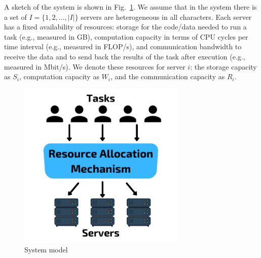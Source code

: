 A sketch of the system is shown in Fig.~\ref{fig:system_model}.
We assume that in the system there is a set of $I = \{1,2,\ldots,\left|I\right|\}$ servers are heterogeneous in all
characters. Each server has a fixed availability of resources: storage for the code/data needed to run a task
(e.g., measured in GB), computation capacity in terms of CPU cycles per time interval (e.g., measured in FLOP/s),
and communication bandwidth to receive the data and to send back the results of the task after execution
(e.g., measured in Mbit/s). We denote these resources for server $i$: the storage capacity as $S_i$, computation
capacity as $W_i$, and the communication capacity as $R_i$.

\begin{figure}
    \centering
    \includegraphics[width=8cm]{figures/system_model.pdf}
    \caption{System model}
    \label{fig:system_model}
\end{figure}

